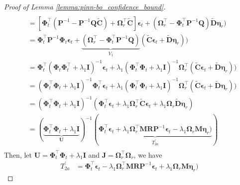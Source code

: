 \begin{proof}[Proof of Lemma \ref{lemma:pinn-bo_confidence_bound}]
\begin{align*}
\\
       & = \left[\boldsymbol{\Phi}_t^\top (\mathbf{P}^{-1} - \mathbf{P}^{-1}\mathbf{Q}\widetilde{\mathbf{C}}) +  \boldsymbol{\Omega}_r^\top \widetilde{\mathbf{C}}\right]\boldsymbol{\epsilon}_t + (\boldsymbol{\Omega}_r^\top - \boldsymbol{\Phi}_t^\top\mathbf{P}^{-1}\mathbf{Q})\widetilde{\mathbf{D}} \boldsymbol{\eta}_r) 
\\ 
       & = \boldsymbol{\Phi}_t^\top \mathbf{P}^{-1} \boldsymbol{\Phi}_t \boldsymbol{\epsilon}_t + \underbrace{(\boldsymbol{\Omega}_r^\top - \boldsymbol{\Phi}_t^\top\mathbf{P}^{-1}\mathbf{Q})}_{V_1}(\widetilde{\mathbf{C}} \boldsymbol{\epsilon}_t + \widetilde{\mathbf{D}} \boldsymbol{\eta}_r) ) \\
       & = \boldsymbol{\Phi}_t^\top (\boldsymbol{\Phi}_t\boldsymbol{\Phi}_t^\top + \lambda_1\mathbf{I})^{-1} \boldsymbol{\epsilon}_t + \lambda_1(\boldsymbol{\Phi}_t^\top\boldsymbol{\Phi}_t + \lambda_1\mathbf{I})^{-1} \boldsymbol{\Omega}_r^\top (\widetilde{\mathbf{C}} \boldsymbol{\epsilon}_t + \widetilde{\mathbf{D}} \boldsymbol{\eta}_r) ) 
\\
       & = (\boldsymbol{\Phi}_t^\top\boldsymbol{\Phi}_t + \lambda_1\mathbf{I})^{-1} \boldsymbol{\Phi}_t^\top \boldsymbol{\epsilon}_t + \lambda_1(\boldsymbol{\Phi}_t^\top\boldsymbol{\Phi}_t + \lambda_1\mathbf{I})^{-1} \boldsymbol{\Omega}_r^\top (\widetilde{\mathbf{C}} \boldsymbol{\epsilon}_t + \widetilde{\mathbf{D}} \boldsymbol{\eta}_r) ) 
\\
       & = (\boldsymbol{\Phi}_t^\top\boldsymbol{\Phi}_t + \lambda_1\mathbf{I})^{-1} (\boldsymbol{\Phi}_t^\top \boldsymbol{\epsilon}_t + \lambda_1\boldsymbol{\Omega}_r^\top \widetilde{\mathbf{C}} \boldsymbol{\epsilon}_t +  \lambda_1\boldsymbol{\Omega}_r\widetilde{\mathbf{D}} \boldsymbol{\eta}_r) 
\\
       & = (\underbrace{\boldsymbol{\Phi}_t^\top\boldsymbol{\Phi}_t + \lambda_1\mathbf{I}}_\mathbf{U})^{-1} (\underbrace{\boldsymbol{\Phi}_t^\top \boldsymbol{\epsilon}_t + \lambda_1\boldsymbol{\Omega}_r^\top \mathbf{MR}\mathbf{P}^{-1} \boldsymbol{\epsilon}_t -  \lambda_1\boldsymbol{\Omega}_r \mathbf{M} \boldsymbol{\eta}_r)}_{T_{2a}^\prime})
\\
   \end{align*}
   Then, let $\mathbf{U} = \boldsymbol{\Phi}_t^\top\boldsymbol{\Phi}_t + \lambda_1\mathbf{I}$ and $\mathbf{J} = \boldsymbol{\Omega}_r^\top \boldsymbol{\Omega}_r$, we have 
   \begin{align*}
       T_{2a}^\prime &= \boldsymbol{\Phi}_t^\top \boldsymbol{\epsilon}_t -
       \lambda_1\boldsymbol{\Omega}_r^\top \mathbf{MR}\mathbf{P}^{-1} \boldsymbol{\epsilon}_t +  \lambda_1\boldsymbol{\Omega}_r \mathbf{M} \boldsymbol{\eta}_r) 

\end{align*}
\end{proof}
